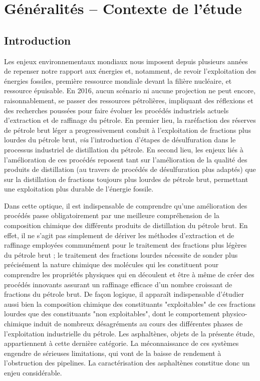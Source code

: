 \documentclass[12pt,a4paper]{book}
\begin{document}
	
	
\chapter{Généralités -- Contexte de l'étude}
\minitoc
\restoregeometry

\newpage	
	\section*{Introduction}
	
Les enjeux environnementaux mondiaux nous imposent depuis plusieurs années de repenser notre rapport aux énergies et, notamment, de revoir l'exploitation des énergies fossiles, première ressource mondiale devant la filière nucléaire, et ressource épuisable. En 2016, aucun scénario ni aucune projection ne peut encore, raisonnablement, se passer des ressources pétrolières, impliquant des réflexions et des recherches poussées pour faire évoluer les procédés industriels actuels d'extraction et de raffinage du pétrole. En premier lieu, la raréfaction des réserves de pétrole brut léger a progressivement conduit à l'exploitation de fractions plus lourdes du pétrole brut, \textit{via} l'introduction d'étapes de désulfuration dans le processus industriel de distillation du pétrole. En second lieu, les enjeux liés à l'amélioration de ces procédés reposent tant sur l'amélioration de la qualité des produits de distillation (au travers de procédés de désulfuration plus adaptés) que sur la distillation de fractions toujours plus lourdes de pétrole brut, permettant une exploitation plus durable de l'énergie fossile. 

Dans cette optique, il est indispensable de comprendre qu'une amélioration des procédés passe obligatoirement par une meilleure compréhension de la composition chimique des différents produits de distillation du pétrole brut. En effet, il ne s'agit pas simplement de dériver les méthodes d'extraction et de raffinage employées communément pour le traitement des fractions plus légères du pétrole brut ; le traitement des fractions lourdes nécessite de sonder plus précisément la nature chimique des molécules qui les constituent pour comprendre les propriétés physiques qui en découlent et être à même de créer des procédés innovants assurant un raffinage efficace d'un nombre croissant de fractions du pétrole brut. De façon logique, il apparaît indispensable d'étudier aussi bien la composition chimique des constituants "exploitables" de ces fractions lourdes que des constituants "non exploitables", dont le comportement physico-chimique induit de nombreux désagréments au cours des différentes phases de l'exploitation industrielle du pétrole. Les asphaltènes, objets de la présente étude, appartiennent à cette dernière catégorie. La méconnaissance de ces systèmes engendre de sérieuses limitations, qui vont de la baisse de rendement à l'obstruction des pipelines. La caractérisation des asphaltènes constitue donc un enjeu considérable. 
\end{document}
